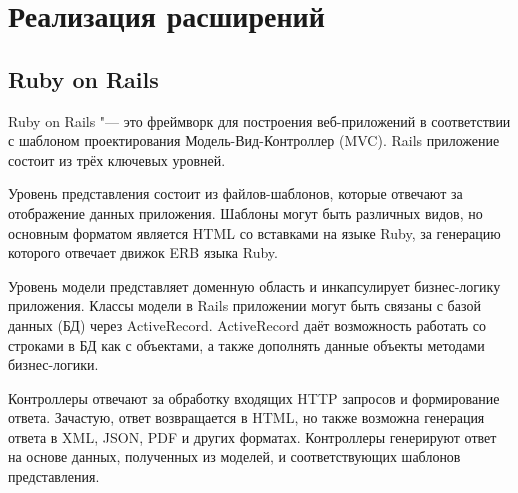 \lstset{language=Ruby}

\chapter{Реализация расширений}
\label{section:implementation}

\section{Ruby on Rails}
Ruby on Rails "--- это фреймворк для построения веб-приложений в соответствии с
шаблоном проектирования Модель-Вид-Контроллер (MVC). Rails приложение состоит
из трёх ключевых уровней.

Уровень представления состоит из файлов-шаблонов, которые отвечают за
отображение данных приложения. Шаблоны могут быть различных видов, но основным
форматом является HTML со вставками на языке Ruby, за генерацию которого
отвечает движок ERB языка Ruby.

Уровень модели представляет доменную область и инкапсулирует бизнес-логику
приложения. Классы модели в Rails приложении могут быть связаны с базой данных
(БД) через ActiveRecord. ActiveRecord даёт возможность работать со строками в
БД как с объектами, а также дополнять данные объекты методами бизнес-логики.

Контроллеры отвечают за обработку входящих HTTP запросов и формирование ответа.
Зачастую, ответ возвращается в HTML, но также возможна генерация ответа в XML,
JSON, PDF и других форматах. Контроллеры генерируют ответ на основе данных,
полученных из моделей, и соответствующих шаблонов представления.

